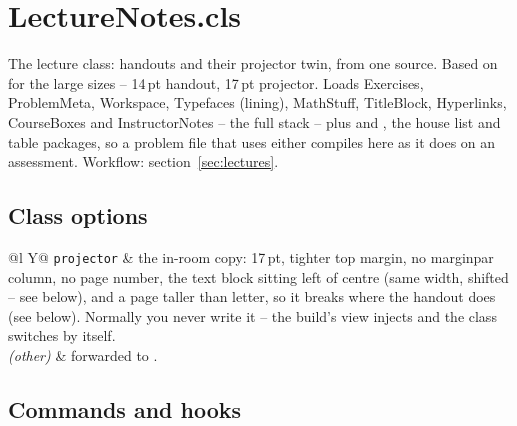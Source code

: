\section{LectureNotes.cls}\label{sec:ref-lecturenotes}

The lecture class: handouts and their projector twin, from one source.
Based on  for the large sizes -- 14\,pt handout, 17\,pt
projector. Loads Exercises, ProblemMeta, Workspace, Typefaces (lining),
MathStuff, TitleBlock, Hyperlinks, CourseBoxes and InstructorNotes -- the full
stack -- plus  and , the house list and table
packages, so a problem file that uses either compiles here as it does on an
assessment. Workflow: section~\ref{sec:lectures}.

\subsection*{Class options}

\begin{center}
\begin{tabularx}{\linewidth}{@{}l Y@{}}
\texttt{projector} & the in-room copy: 17\,pt, tighter top margin, no
  marginpar column, no page number, the text block sitting left of
  centre (same width, shifted -- see below), and a page taller than
  letter, so it breaks where the handout does (see below).
  Normally you never write it -- the build's  view injects
   and the class switches by itself.\\
\emph{(other)} & forwarded to .\\
\end{tabularx}
\end{center}

\subsection*{Commands and hooks}

